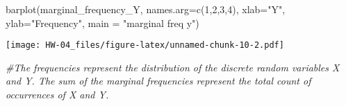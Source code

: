 \documentclass[
]{article}
\newenvironment{Shaded}{\begin{snugshade}}{\end{snugshade}}
\newcommand{\AttributeTok}[1]{\textcolor[rgb]{0.77,0.63,0.00}{#1}}
\newcommand{\CommentTok}[1]{\textcolor[rgb]{0.56,0.35,0.01}{\textit{#1}}}
\newcommand{\DecValTok}[1]{\textcolor[rgb]{0.00,0.00,0.81}{#1}}
\newcommand{\FunctionTok}[1]{\textcolor[rgb]{0.00,0.00,0.00}{#1}}
\newcommand{\NormalTok}[1]{#1}
\newcommand{\StringTok}[1]{\textcolor[rgb]{0.31,0.60,0.02}{#1}}
\begin{document}
\begin{Shaded}
\begin{Highlighting}[]
\FunctionTok{barplot}\NormalTok{(marginal\_frequency\_Y, }\AttributeTok{names.arg=}\FunctionTok{c}\NormalTok{(}\DecValTok{1}\NormalTok{,}\DecValTok{2}\NormalTok{,}\DecValTok{3}\NormalTok{,}\DecValTok{4}\NormalTok{), }\AttributeTok{xlab=}\StringTok{"Y"}\NormalTok{, }\AttributeTok{ylab=}\StringTok{"Frequency"}\NormalTok{, }\AttributeTok{main =} \StringTok{"marginal freq y"}\NormalTok{)}
\end{Highlighting}
\end{Shaded}

\texttt{[image: HW-04\_files/figure-latex/unnamed-chunk-10-2.pdf]}

\begin{Shaded}
\begin{Highlighting}[]

\CommentTok{\#The frequencies represent the distribution of the discrete random variables X and Y. The sum of the marginal frequencies represent the total count of occurrences of X and Y. }
\end{Highlighting}
\end{Shaded}
\end{document}
